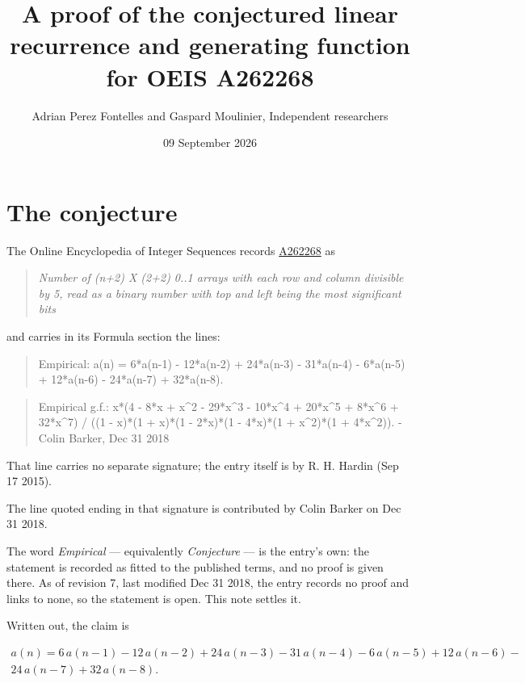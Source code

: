 \documentclass[11pt]{article}
\title{A proof of the conjectured linear recurrence and generating function for OEIS A262268}
\author{Adrian Perez Fontelles and Gaspard Moulinier, Independent researchers}
\date{09 September 2026}
\theoremstyle{definition}
\begin{document}
\maketitle
\section{The conjecture}

The Online Encyclopedia of Integer Sequences records \href{https://oeis.org/A262268}{A262268} as

\begin{quote}\itshape Number of (n+2) X (2+2) 0..1 arrays with each row and column divisible by 5, read as a binary number with top and left being the most significant bits\end{quote}

and carries in its Formula section the lines:

\begin{quote}\ttfamily Empirical: a(n) = 6*a(n-1) - 12*a(n-2) + 24*a(n-3) - 31*a(n-4) - 6*a(n-5) + 12*a(n-6) - 24*a(n-7) + 32*a(n-8).\end{quote}

\begin{quote}\ttfamily Empirical g.f.: x*(4 - 8*x + x\textasciicircum{}2 - 29*x\textasciicircum{}3 - 10*x\textasciicircum{}4 + 20*x\textasciicircum{}5 + 8*x\textasciicircum{}6 + 32*x\textasciicircum{}7) / ((1 - x)*(1 + x)*(1 - 2*x)*(1 - 4*x)*(1 + x\textasciicircum{}2)*(1 + 4*x\textasciicircum{}2)). - Colin Barker, Dec 31 2018\end{quote}

That line carries no separate signature; the entry itself is by R. H. Hardin (Sep 17 2015).

The line quoted ending in that signature is contributed by Colin Barker on Dec 31 2018.

The word {\itshape Empirical} --- equivalently {\itshape Conjecture} --- is the entry's own: the statement is recorded as fitted to the published terms, and no proof is given there. As of revision 7, last modified Dec 31 2018, the entry records no proof and links to none, so the statement is open. This note settles it.

Written out, the claim is

\begin{multline*} a(n) = 6\,a(n-1) - 12\,a(n-2) + 24\,a(n-3) - 31\,a(n-4) - 6\,a(n-5) + 12\,a(n-6) - \\ 24\,a(n-7) + 32\,a(n-8). \end{multline*}
\end{document}
